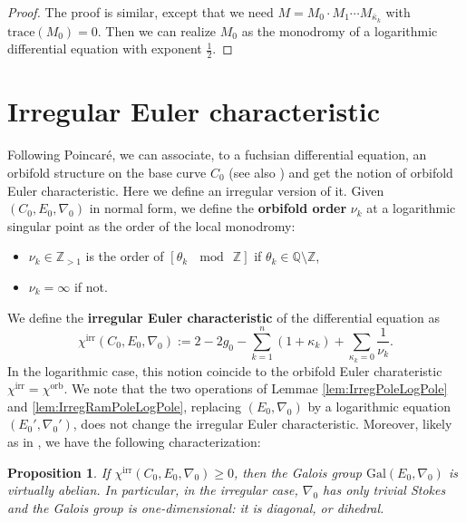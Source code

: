 \documentclass[12]{amsart}
\newtheorem{prop}[thm]{Proposition}
\begin{document}
\begin{proof}The proof is similar, except that we need $M=M_0\cdot M_1\cdots M_{\bar\kappa_k}$ with
$\mathrm{trace}(M_0)=0$.
Then we can realize $M_0$ as the monodromy of a logarithmic differential equation with exponent $\frac{1}{2}$.
\end{proof}

\section{Irregular Euler characteristic}\label{sec:IrregEuler}

Following Poincar\'e, we can associate, to a fuchsian differential equation,
an orbifold structure on the base curve $C_0$ (see also \cite{Diarra1})
and get the notion of orbifold Euler characteristic. Here we define an irregular version of it.
Given $(C_0,E_0,\nabla_0)$ in normal form, 
we define the {\bf orbifold order} $\nu_k$ at a logarithmic
singular point as the order of the local monodromy:
\begin{itemize}
\item $\nu_k\in\mathbb Z_{>1}$ is the order of $[\theta_k\ \mod\ \mathbb Z]$ if $\theta_k\in\mathbb Q\setminus\mathbb Z$,
\item $\nu_k=\infty$ if not.
\end{itemize}
We define the {\bf irregular Euler characteristic} of the differential equation as
$$\chi^{\mathrm{irr}}(C_0,E_0,\nabla_0):=2-2g_0-\sum_{k=1}^{n}(1+\kappa_k)+\sum_{\kappa_k=0}\frac{1}{\nu_k}.$$
In the logarithmic case, this notion coincide to the orbifold Euler charateristic $\chi^{\mathrm{irr}}=\chi^{\mathrm{orb}}$.
We note that the two operations of Lemmae \ref{lem:IrregPoleLogPole} and \ref{lem:IrregRamPoleLogPole},
replacing $(E_0,\nabla_0)$ by a logarithmic equation $(E_0',\nabla_0')$, does not change the irregular Euler characteristic.
Moreover, likely as in \cite[Prop. 2.5]{Diarra1}, we have the following characterization:

\begin{prop}\label{prop:chiPositive}
If $\chi^{\mathrm{irr}}(C_0,E_0,\nabla_0)\ge0$, then the Galois group $\mathrm{Gal}(E_0,\nabla_0)$ 
is virtually abelian. In particular, in the irregular case, $\nabla_0$ has only trivial Stokes and the Galois group 
is one-dimensional: it is diagonal, or dihedral.
\end{prop}
\end{document}
